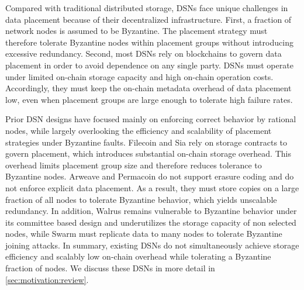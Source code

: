Compared with traditional distributed storage, DSNs face unique challenges in data placement because of their decentralized infrastructure.
First, a fraction of network nodes is assumed to be Byzantine.
The placement strategy must therefore tolerate Byzantine nodes within placement groups without introducing excessive redundancy.
Second, most DSNs rely on blockchains to govern data placement in order to avoid dependence on any single party.
DSNs must operate under limited on-chain storage capacity and high on-chain operation costs.
Accordingly, they must keep the on-chain metadata overhead of data placement low, even when placement groups are large enough to tolerate high failure rates.

Prior DSN designs have focused mainly on enforcing correct behavior by rational nodes, while largely overlooking the efficiency and scalability of placement strategies under Byzantine faults.
Filecoin and Sia rely on storage contracts to govern placement, which introduces substantial on-chain storage overhead.
This overhead limits placement group size and therefore reduces tolerance to Byzantine nodes.
Arweave and Permacoin do not support erasure coding and do not enforce explicit data placement.
As a result, they must store copies on a large fraction of all nodes to tolerate Byzantine behavior, which yields unscalable redundancy.
In addition, Walrus remains vulnerable to Byzantine behavior under its committee based design and underutilizes the storage capacity of non selected nodes, while Swarm must replicate data to many nodes to tolerate Byzantine joining attacks.
In summary, existing DSNs do not simultaneously achieve storage efficiency and scalably low on-chain overhead while tolerating a Byzantine fraction of nodes.
We discuss these DSNs in more detail in \autoref{sec:motivation:review}.

